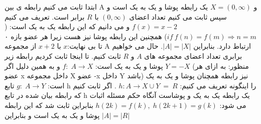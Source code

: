 \p
ابتدا ثابت می کنیم رابطه ی بین A و 
$X = (0, \infty)$ یک رابطه پوشا و یک به یک است و سپس ثابت می کنیم تعداد اعضای
 $(0, \infty)$
 با $R$ برابر است.
 		\newline
 		تعریف می کنیم $f(x) = x - 2$ و می دانیم که این رابطه یک به یک است: ($if \: f(n) = f(m) \Rightarrow n = m$)
 		\newline
 		همچنین این رابطه پوشا نیز هست زیرا هر عضو بازه ۰ تا بی نهایت:$x$ با $x + 2$ از مجموعه A ارتباط دارد.
 		بنابراین $|A| = |X|$.
 		\bigbreak
 		حال می خواهیم برابری تعداد اعضای مجموعه های $A$ و $R$ ثابت کنیم.
 		\newline
 		تا اینجا ثابت کردیم رابطه زیر پوشا و یک به یک است:
 		\bigbreak
 		$f:\; A \rightarrow X$
 		\bigbreak
 		و به همین دلیل اگر $Y = -X$ (منظور: به ازای هر عضو x داخل مجموعه X عضو -x داخل Y باشد) نیز رابطه همچنان پوشا و یک به یک است:
 		\bigbreak
 		$g:\; A \rightarrow Y$
 		\bigbreak
 		تابع h را اینگونه تعریف می کنیم: $h: A \rightarrow X \cup Y \:= \: R$ . اگر ثابت کنیم که رابطه بیان شده در تابع h یک رابطه یک به یک و پوشاست آنگاه حکم مسئله اثبات می شود:
 		\bigbreak
 		$h(2k) = f(k),\; h(2k+1) = g(k)$
 		\bigbreak
 		بنابراین ثابت شد که این رابطه پوشا و یک به یک است و بنابراین $|A| = |R|$
 		\bigbreak	